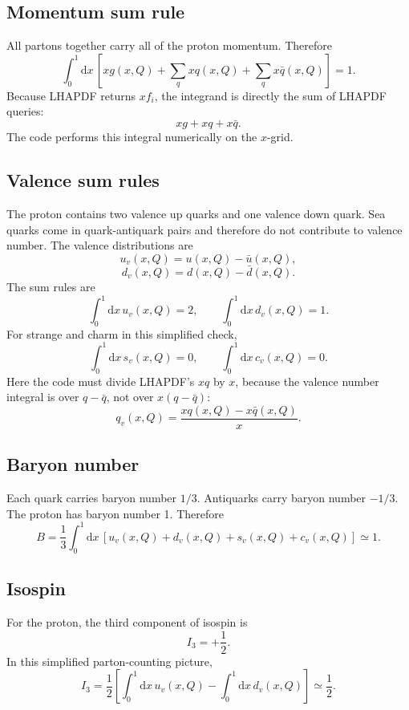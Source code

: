 \documentclass[11pt]{article}
\newcommand{\dd}{\mathrm{d}}
\begin{document}
\subsection{Momentum sum rule}

All partons together carry all of the proton momentum.  Therefore
\[
  \int_0^1 \dd x\,
  \left[
    xg(x,Q)
    +
    \sum_q xq(x,Q)
    +
    \sum_q x\bar q(x,Q)
    \right]
  =1.
\]
Because LHAPDF returns \(x f_i\), the integrand is directly the sum of LHAPDF
queries:
\[
  xg + xq + x\bar q.
\]
The code performs this integral numerically on the \(x\)-grid.

\subsection{Valence sum rules}

The proton contains two valence up quarks and one valence down quark.  Sea
quarks come in quark-antiquark pairs and therefore do not contribute to valence
number.  The valence distributions are
\[
  u_v(x,Q)=u(x,Q)-\bar u(x,Q),
\]
\[
  d_v(x,Q)=d(x,Q)-\bar d(x,Q).
\]
The sum rules are
\[
  \int_0^1 \dd x\,u_v(x,Q)=2,
  \qquad
  \int_0^1 \dd x\,d_v(x,Q)=1.
\]
For strange and charm in this simplified check,
\[
  \int_0^1 \dd x\,s_v(x,Q)=0,
  \qquad
  \int_0^1 \dd x\,c_v(x,Q)=0.
\]
Here the code must divide LHAPDF's \(xq\) by \(x\), because the valence number
integral is over \(q-\bar q\), not over \(x(q-\bar q)\):
\[
  q_v(x,Q)
  =
  \frac{xq(x,Q)-x\bar q(x,Q)}{x}.
\]

\subsection{Baryon number}

Each quark carries baryon number \(1/3\).  Antiquarks carry baryon number
\(-1/3\).  The proton has baryon number 1.  Therefore
\[
  B
  =
  \frac{1}{3}
  \int_0^1 \dd x\,
  \left[
    u_v(x,Q)+d_v(x,Q)+s_v(x,Q)+c_v(x,Q)
    \right]
  \simeq 1.
\]

\subsection{Isospin}

For the proton, the third component of isospin is
\[
  I_3 = +\frac{1}{2}.
\]
In this simplified parton-counting picture,
\[
  I_3
  =
  \frac{1}{2}
  \left[
    \int_0^1 \dd x\,u_v(x,Q)
    -
    \int_0^1 \dd x\,d_v(x,Q)
    \right]
  \simeq \frac{1}{2}.
\]
\end{document}

